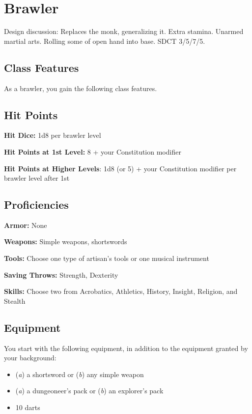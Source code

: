 \section{Brawler\label{class:brawler}}

Design discussion: Replaces the monk, generalizing it. Extra stamina. Unarmed martial arts. Rolling some of open hand into base. SDCT 3/5/7/5.

\subsection{Class Features}

As a brawler, you gain the following class features.

\subsection{Hit Points}

\textbf{Hit Dice:} 1d8 per brawler level

\textbf{Hit Points at 1st Level:} 8 + your Constitution modifier

\textbf{Hit Points at Higher Levels}: 1d8 (or 5) + your Constitution modifier per brawler level after 1st

\subsection{Proficiencies}

\textbf{Armor:} None

\textbf{Weapons:} Simple weapons, shortswords

\textbf{Tools:} Choose one type of artisan's tools or one musical instrument

\textbf{Saving Throws:} Strength, Dexterity

\textbf{Skills:} Choose two from Acrobatics, Athletics, History, Insight, Religion, and Stealth

\subsection{Equipment}

You start with the following equipment, in addition to the equipment granted by your background:
\begin{itemize}
\item (\textit{a}) a shortsword or (\textit{b}) any simple weapon
\item (\textit{a}) a dungeoneer's pack or (\textit{b}) an explorer's pack
\item 10 darts
\end{itemize}

